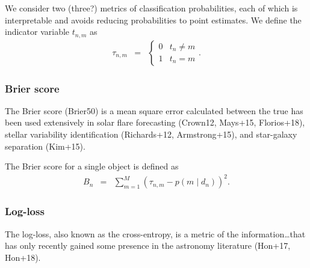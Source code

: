 

We consider two (three?) metrics of classification probabilities, each of which is interpretable and avoids reducing probabilities to point estimates.
We define the indicator variable $t_{n, m}$ as
\begin{eqnarray}
  \tau_{n, m} &=& \begin{cases}
  0 & t_{n} \neq m\\
  1 & t_{n} = m
  \end{cases}.
\end{eqnarray}


\subsubsection{Brier score}
\label{sec:brier}

The Brier score (Brier50) is a mean square error calculated between the true has been used extensively in solar flare forecasting (Crown12, Mays+15, Florios+18), stellar variability identification (Richards+12, Armstrong+15), and star-galaxy separation (Kim+15).

The Brier score for a single object is defined as
\begin{eqnarray}
B_{n} &=& \sum_{m=1}^{M}(\tau_{n, m}-p(m \mid d_{n}))^{2}.
\end{eqnarray}

\subsubsection{Log-loss}
\label{sec:logloss}


The log-loss, also known as the cross-entropy, is a metric of the information\dots that has only recently gained some presence in the astronomy literature (Hon+17, Hon+18).

